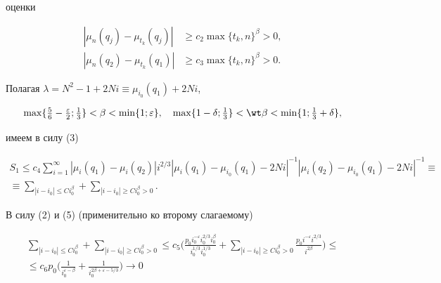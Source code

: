 оценки 


\begin{equation} 


\begin{split} 


|\mu_n(q_j)-\mu_{t_k}(q_j)|&\ge c_2\max 


\{t_k,n\}^\beta>0,\\ 


|\mu_n(q_2)-\mu_{t_k}(q_1)|&\ge c_3\max 


\{t_k,n\}^\beta>0. 


\end{split} 


\end{equation} 


Полагая $\lambda=N^2-1+2N i\equiv\mu_{i_0}(q_1)+2N i$, 


$$ 


\max\{\tfrac{5}{6}-\tfrac{\varepsilon}{2};\tfrac{1}{3}\} 


<\beta<\min\{1;\varepsilon\},\quad 


\max\{1-\delta;\tfrac{1}{3}\}<\wt\beta<\min 


\{1;\tfrac{1}{3}+\delta\}, 


$$ 


имеем в силу (3) 


\begin{gather*} 


S_1\le c_4\sum^\infty_{i=1} 


|\mu_i(q_1)-\mu_i(q_2)|i^{2/3} 


|\mu_i(q_1)-\mu_{i_0}(q_1)-2N i|^{-1} 


|\mu_i(q_2)-\mu_{i_0}(q_1)-2N i|^{-1}\equiv \\ 


% 


\equiv\sum_{|i-i_0|\le C i^\beta_0}+ 


\sum_{|i-i_0|\ge C i^\beta_0>0}. 


\end{gather*} 


 


В силу (2) и (5) (применительно ко второму слагаемому) 


\begin{gather*} 


\sum_{|i-i_0|\le C i^\beta_0}+\sum_{|i-i_0|\ge C i^\beta_0>0}\le 


c_5\bigg(\frac{p_0i^{-\varepsilon}_0i^{2/3}_0i^\beta_0} 


{i^{1/3}_0i^{1/3}_0}+\sum_{|i-i_0|\ge C i^\beta_0>0} 


\frac{p_0i^{-\varepsilon}i^{2/3}}{i^{2\beta}}\bigg)\le \\ 


% 


\le c_6 p_0\bigg(\frac{1}{i_0^{\varepsilon-\beta}}+ 


\frac{1}{i_0^{2\beta+\varepsilon-5/3}}\bigg)\to 0 


\end{gather*} 


